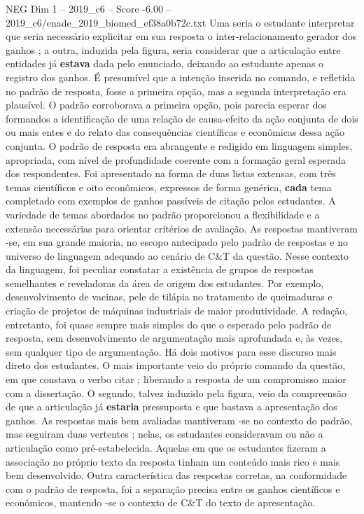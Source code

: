\begin{textsample}{NEG Dim 1 – 2019\_c6 – Score -6.00 – 2019\_c6/enade\_2019\_biomed\_ef38a0b72c.txt}
Uma seria o estudante interpretar que seria necessário explicitar em sua resposta o inter-relacionamento gerador dos ganhos ; a outra, induzida pela figura, seria considerar que a articulação entre entidades já \textbf{estava} dada pelo enunciado, deixando ao estudante apenas o registro dos ganhos.
É presumível que a intenção inserida no comando, e refletida no padrão de resposta, fosse a primeira opção, mas a segunda interpretação era plausível.
O padrão corroborava a primeira opção, pois parecia esperar dos formandos a identificação de uma relação de causa-efeito da ação conjunta de dois ou mais entes e do relato das consequências científicas e econômicas dessa ação conjunta.
O padrão de resposta era abrangente e redigido em linguagem simples, apropriada, com nível de profundidade coerente com a formação geral esperada dos respondentes.
Foi apresentado na forma de duas listas extensas, com três temas científicos e oito econômicos, expressos de forma genérica, \textbf{cada} tema completado com exemplos de ganhos passíveis de citação pelos estudantes.
A variedade de temas abordados no padrão proporcionou a flexibilidade e a extensão necessárias para orientar critérios de avaliação.
As respostas mantiveram -se, em sua grande maioria, no escopo antecipado pelo padrão de respostas e no universo de linguagem adequado ao cenário de C\&T da questão.
Nesse contexto da linguagem, foi peculiar constatar a existência de grupos de respostas semelhantes e reveladoras da área de origem dos estudantes.
Por exemplo, desenvolvimento de vacinas, pele de tilápia no tratamento de queimaduras e criação de projetos de máquinas industriais de maior produtividade.
A redação, entretanto, foi quase sempre mais simples do que o esperado pelo padrão de resposta, sem desenvolvimento de argumentação mais aprofundada e, às vezes, sem qualquer tipo de argumentação.
Há dois motivos para esse discurso mais direto dos estudantes.
O mais importante veio do próprio comando da questão, em que constava o verbo citar ; liberando a resposta de um compromisso maior com a dissertação.
O segundo, talvez induzido pela figura, veio da compreensão de que a articulação já \textbf{estaria} pressuposta e que bastava a apresentação dos ganhos.
As respostas mais bem avaliadas mantiveram -se no contexto do padrão, mas seguiram duas vertentes ; nelas, os estudantes consideravam ou não a articulação como pré-estabelecida.
Aquelas em que os estudantes fizeram a associação no próprio texto da resposta tinham um conteúdo mais rico e mais bem desenvolvido.
Outra característica das respostas corretas, na conformidade com o padrão de resposta, foi a separação precisa entre os ganhos científicos e econômicos, mantendo -se o contexto de C\&T do texto de apresentação.

\end{textsample}
